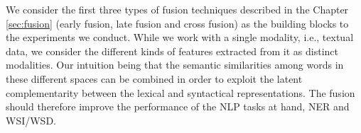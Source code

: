 %
%

We consider the first three types of fusion techniques described in the Chapter \ref{sec:fusion} (early fusion, late fusion and cross fusion) as the building blocks to the experiments we conduct.  While we work with a single modality, i.e., textual data, we consider the different kinds of features extracted from it as distinct modalities. Our intuition being that the semantic similarities among words in these different spaces can be combined in order to exploit the latent complementarity between the lexical and syntactical representations. The fusion should therefore improve the performance of the NLP tasks at hand, NER and WSI/WSD.

